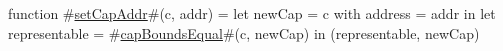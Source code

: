 function #\hyperref[sailMIPSzsetCapAddr]{setCapAddr}#(c, addr) =
    let newCap = { c with address = addr } in
    let representable = #\hyperref[sailMIPSzcapBoundsEqual]{capBoundsEqual}#(c, newCap) in
    (representable, newCap)
